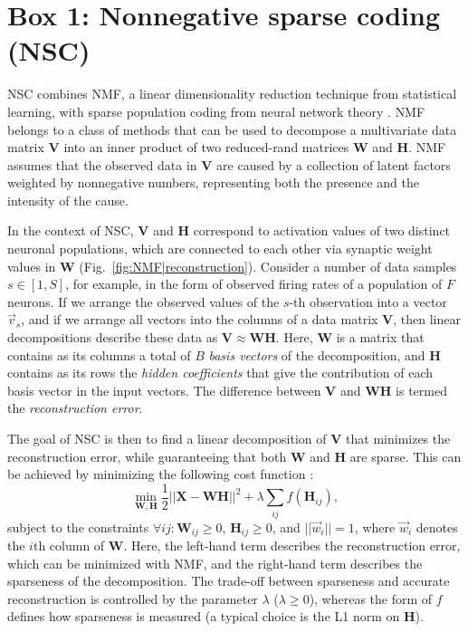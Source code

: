 

\section{Box 1: Nonnegative sparse coding (NSC)}
\label{box:NSC}


\Acf{NSC} combines \acf{NMF},
a linear dimensionality reduction technique from statistical learning,
with sparse population coding from neural network theory
\citep{Hoyer2002,EggertKorner2004}.
\ac{NMF} belongs to a class of methods that can be used to decompose
a multivariate data matrix \textbf{V}
into an inner product of two reduced-rand matrices \textbf{W} and \textbf{H}.
\ac{NMF} assumes that the observed data in \textbf{V} are caused by a collection
of latent factors weighted by nonnegative numbers,
representing both the presence and the intensity of the cause.

In the context of \ac{NSC},
\textbf{V} and \textbf{H} correspond to activation values
of two distinct neuronal populations,
which are connected to each other via synaptic weight values
in \textbf{W}
(Fig.~\ref{fig:NMF|reconstruction}).
Consider a number of data samples $s \in [1, S]$, for example,
in the form of observed firing rates of a population of $F$ neurons.
If we arrange the observed values of the $s$-th observation 
into a vector $\vec{v}_s$,
and if we arrange all vectors into the columns of a data matrix \textbf{V},
then linear decompositions describe these data as
$\mathbf{V} \approx \mathbf{WH}$.
Here, \textbf{W} is a matrix that contains as its columns
a total of $B$ \emph{basis vectors} of the decomposition, 
and \textbf{H} contains as its rows the \emph{hidden coefficients}
that give the contribution of each basis vector in the input vectors.
The difference between \textbf{V} and \textbf{WH} is termed
the \emph{reconstruction error}.

The goal of \ac{NSC} is then to find a linear decomposition of \textbf{V}
that minimizes the reconstruction error,
while guaranteeing that both \textbf{W} and \textbf{H} are sparse.
This can be achieved by minimizing the following cost function
\citep{Hoyer2002}:
\begin{equation}
\min_{\mathbf{W}, \mathbf{H}} \frac{1}{2} ||\mathbf{X} -\mathbf{WH}||^2 + \lambda \sum_{ij} f(\mathbf{H}_{ij}),
\end{equation}
subject to the constraints
$\forall ij: \mathbf{W}_{ij} \geq 0$, $\mathbf{H}_{ij} \geq 0$, and
$||\vec{w}_i|| = 1$, where $\vec{w}_i$ denotes the $i$th column of \textbf{W}.
Here, the left-hand term describes the reconstruction error, which can
be minimized with \ac{NMF},
and the right-hand term describes the sparseness of the decomposition.
The trade-off between sparseness and accurate reconstruction
is controlled by the parameter $\lambda$ ($\lambda \geq 0$), whereas
the form of $f$ defines how sparseness is measured
(a typical choice is the L1 norm on \textbf{H}).

